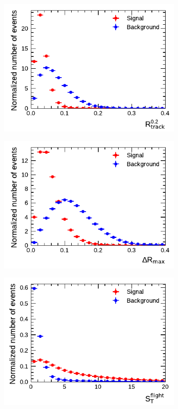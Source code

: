 \begin{figure}[!ht]
  \begin{subfigure}{0.5\textwidth}
    \centering
    \includegraphics{./figures/baseline_bdt_vars/3p/innerTrkAvgDist.pdf}
  \end{subfigure}%
  \begin{subfigure}{0.5\textwidth}
    \centering
    \includegraphics{./figures/baseline_bdt_vars/3p/dRmax.pdf}
  \end{subfigure}
  \begin{subfigure}{0.5\textwidth}
    \centering
    \includegraphics{./figures/baseline_bdt_vars/3p/trFlightPathSig.pdf}

\end{subfigure}
\end{figure}
